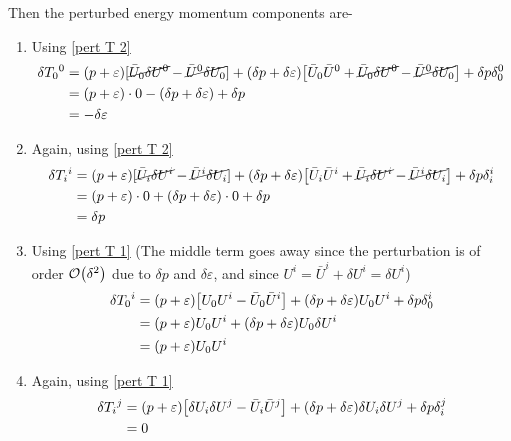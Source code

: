 \documentclass[12pt, letterpaper]{report}
\begin{document}
Then the perturbed energy momentum components are-
\begin{enumerate}
    \item Using \cref{pert T 2}
    \begin{align*}
        \delta T_0{}^0&= \qty(p+\varepsilon)\qty[\cancel{\bar{U}_0 \delta U^0}-\cancel{\bar{U}^0 \delta U_0}]+\qty(\delta p+\delta\varepsilon)\qty[{\bar{U}_0 \bar{U}^0}+\cancel{\bar{U}_0 \delta U^0}-\cancel{\bar{U}^0 \delta U_0}] + \delta p\delta_0^0\\
        &= \qty(p+\varepsilon)\cdot 0-\qty(\delta p+\delta\varepsilon) + \delta p\\
        &= -\delta \varepsilon
    \end{align*}
    \item Again, using \cref{pert T 2}
    \begin{align*}
        \delta T_i{}^i&= \qty(p+\varepsilon)\qty[\cancel{\bar{U}_i \delta U^i}-\cancel{\bar{U}^i \delta U_i}]+\qty(\delta p+\delta\varepsilon)\qty[{\bar{U}_i \bar{U}^i}+\cancel{\bar{U}_i \delta U^i}-\cancel{\bar{U}^i \delta U_i}] + \delta p\delta_i^i\\
        &= \qty(p+\varepsilon)\cdot 0+\qty(\delta p+\delta\varepsilon)\cdot 0 + \delta p\\
        &= \delta p
    \end{align*}
    \item Using \cref{pert T 1} (The middle term goes away since the perturbation is of order $\mathcal{O}\qty(\delta^2)$ due to $\delta p$ and $\delta \varepsilon$, and since $U^i= \bar{U}^i+\delta U^i= \delta U^i$)
    \begin{align*}
        \delta T_0{}^i&= \qty(p+\varepsilon)\qty[U_0 U^i- \bar{U}_0 \bar{U}^i]+\qty(\delta p+\delta\varepsilon)U_0 U^i + \delta p\delta_0^i\\
        &= \qty(p+\varepsilon)U_0 U^i+\qty(\delta p+\delta\varepsilon)U_0 \delta U^i\\
        &= \qty(p+\varepsilon)U_0 U^i
    \end{align*}
    \item Again, using \cref{pert T 1}
    \begin{align*}
        \delta T_i{}^j&= \qty(p+\varepsilon)\qty[\delta U_i \delta U^j- \bar{U}_i \bar{U}^j]+\qty(\delta p+\delta\varepsilon)\delta U_i \delta U^j + \delta p\delta_i^j\\
        &= 0
    \end{align*}
\end{enumerate}
\end{document}
